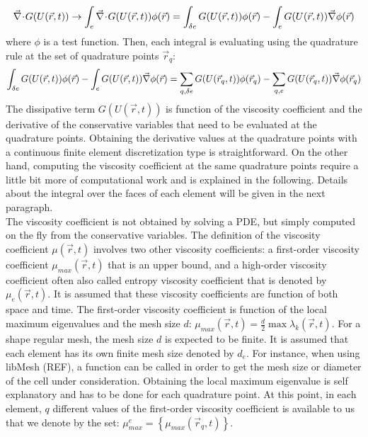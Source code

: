 \begin{equation}
\vec{\nabla}\! \cdot \! G(U(\vec{r},t)) \rightarrow \int_e \vec{\nabla}\! \cdot \! G(U(\vec{r},t)) \phi(\vec{r}) = \int_{\delta e} G(U(\vec{r},t)) \phi(\vec{r}) - \int_e G(U(\vec{r},t)) \vec{\nabla} \phi(\vec{r}) \nonumber
\end{equation} 
where $\phi$ is a test function. Then, each integral is evaluating using the quadrature rule at the set of quadrature points $\vec{r}_q$:
\begin{equation}
\int_{\delta e} G(U(\vec{r},t)) \phi(\vec{r}) - \int_e G(U(\vec{r},t)) \vec{\nabla} \phi(\vec{r}) = \sum_{q,\delta e} G(U(\vec{r}_q,t)) \phi(\vec{r}_q) - \sum_{q,e} G(U(\vec{r}_q,t)) \vec{\nabla} \phi(\vec{r}_q) \nonumber
\end{equation}
The dissipative term $G(U(\vec{r},t))$ is function of the viscosity coefficient and the derivative of the conservative variables that need to be evaluated at the quadrature points. Obtaining the derivative values at the quadrature points with a continuous finite element discretization type is straightforward. On the other hand, computing the viscosity coefficient at the same quadrature points require a little bit more of computational work and is explained in the following. Details about the integral over the faces of each element will be given in the next paragraph.\\
The viscosity coefficient is not obtained by solving a PDE, but simply computed on the fly from the conservative variables. The definition of the viscosity coefficient $\mu(\vec{r},t)$ involves two other viscosity coefficients: a first-order viscosity coefficient $\mu_{max}(\vec{r},t)$ that is an upper bound, and a high-order viscosity coefficient often also called entropy viscosity coefficient that is denoted by $\mu_e(\vec{r},t)$. It is assumed that these viscosity coefficients are function of both space and time. The first-order viscosity coefficient is function of the local maximum eigenvalues and the mesh size $d$: $\mu_{max}(\vec{r},t) = \frac{d}{2} \max \lambda_k (\vec{r},t)$. For a shape regular mesh, the mesh size $d$ is expected to be finite. It is assumed that each element has its own finite mesh size denoted by $d_e$. For instance, when using libMesh (REF), a function can be called in order to get the mesh size or diameter of the cell under consideration. Obtaining the local maximum eigenvalue is self explanatory and has to be done for each quadrature point. At this point, in each element, $q$ different values of the first-order viscosity coefficient is available to us that we denote by the set: $\mu_{max}^e = \left\{ \mu_{max}(\vec{r}_q,t) \right\}$. \\
